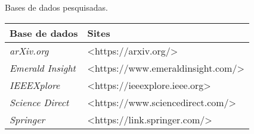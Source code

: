 \begin{quadro}[!htb]
    \centering
    \caption{Bases de dados pesquisadas.\label{qua:basesArtigos}}
    \begin{tabular}{|p{7cm}|p{7cm}|}
		\hline
		\textbf{Base de dados} & \textbf{Sites}                                           \\ \hline
		\textit{arXiv.org}              & \textless{}https://arxiv.org/\textgreater{}              \\ \hline
		\textit{Emerald Insight}        & \textless{}https://www.emeraldinsight.com/\textgreater{} \\ \hline
		\textit{IEEEXplore}             & \textless{}https://ieeexplore.ieee.org\textgreater{}     \\ \hline
		\textit{Science Direct}         & \textless{}https://www.sciencedirect.com/\textgreater{}  \\ \hline
		\textit{Springer}               & \textless{}https://link.springer.com/\textgreater{}      \\ \hline
    \end{tabular}
\end{quadro}
